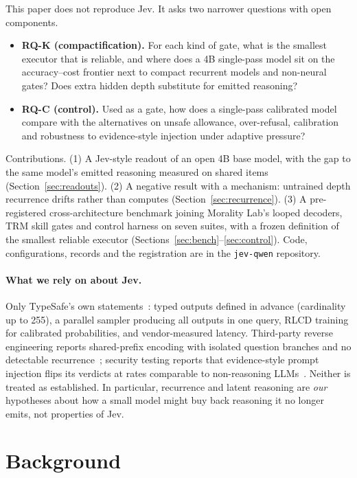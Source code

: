 \documentclass[11pt]{article}
\begin{document}
This paper does not reproduce Jev. It asks two narrower questions with open components.
\begin{itemize}
  \item \textbf{RQ-K (compactification).} For each kind of gate, what is the smallest executor that
  is reliable, and where does a 4B single-pass model sit on the accuracy--cost frontier next to
  compact recurrent models and non-neural gates? Does extra hidden depth substitute for emitted
  reasoning?
  \item \textbf{RQ-C (control).} Used as a gate, how does a single-pass calibrated model compare
  with the alternatives on unsafe allowance, over-refusal, calibration and robustness to
  evidence-style injection under adaptive pressure?
\end{itemize}

Contributions. (1) A Jev-style readout of an open 4B base model, with the gap to the same model's
emitted reasoning measured on shared items (Section~\ref{sec:readouts}). (2) A negative result with a
mechanism: untrained depth recurrence drifts rather than computes (Section~\ref{sec:recurrence}).
(3) A pre-registered cross-architecture benchmark joining Morality Lab's looped decoders, TRM skill
gates and control harness on seven suites, with a frozen definition of the smallest reliable
executor (Sections~\ref{sec:bench}--\ref{sec:control}). Code, configurations, records and the
registration are in the \texttt{jev-qwen} repository.

\paragraph{What we rely on about Jev.} Only TypeSafe's own statements~\cite{typesafe2026jev}:
typed outputs defined in advance (cardinality up to 255), a parallel sampler producing all outputs in
one query, RLCD training for calibrated probabilities, and vendor-measured latency. Third-party
reverse engineering reports shared-prefix encoding with isolated question branches and no detectable
recurrence~\cite{archerhume2026jev}; security testing reports that evidence-style prompt injection
flips its verdicts at rates comparable to non-reasoning LLMs~\cite{checkpoint2026jev}. Neither is
treated as established. In particular, recurrence and latent reasoning are \emph{our} hypotheses about
how a small model might buy back reasoning it no longer emits, not properties of Jev.

\section{Background}
\end{document}
